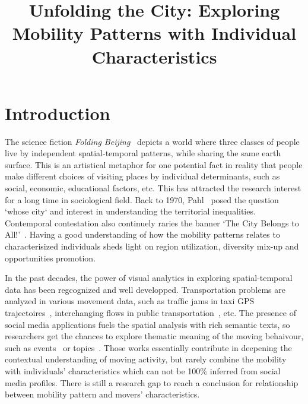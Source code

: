 \documentclass{vgtc}                          %
\title{Unfolding the City: Exploring Mobility Patterns with Individual Characteristics}
\begin{document}



\maketitle

\section{Introduction}

The science fiction \textit{Folding Beijing}~\cite{hao2016_foldingbeijing} depicts a world where three classes of people live by independent spatial-temporal patterns, while sharing the same earth surface. This is an artistical metaphor for one potential fact in reality that people make different choices of visiting places by individual determinants, such as social, economic, educational factors, etc. This has attracted the research interest for a long time in sociological field. Back to 1970, Pahl~\cite{pahl1975whose} posed the question `whose city` and interest in understanding the territorial inequalities. Contemporal contestation also continuely raries the banner `The City Belongs to All!'~\cite{Mayer2017_whosecity}. Having a good understanding of how the mobility patterns relates to characterisized individuals sheds light on region utilization, diversity mix-up and opportunities promotion. 

In the past decades, the power of visual analytics in exploring spatial-temporal data has been regcognized and well developped. Transportation problems are analyzed in various movement data, such as traffic jams in taxi GPS trajectoires~\cite{wang2013visual}, interchanging flows in public transportation~\cite{zeng2013visualizing}, etc. The presence of social media applications fuels the spatial analysis with rich semantic texts, so researchers get the chances to explore thematic meaning of the moving behaivour, such as events~\cite{chen2017map} or topics~\cite{bosch2013scatterblogs2}. Those works essentially contribute in deepening the contextual understanding of moving activity, but rarely combine the mobility with individuals' characteristics which can not be 100\% inferred from social media profiles. There is still a research gap to reach a conclusion for relationship between mobility pattern and movers' characteristics. 
\end{document}
